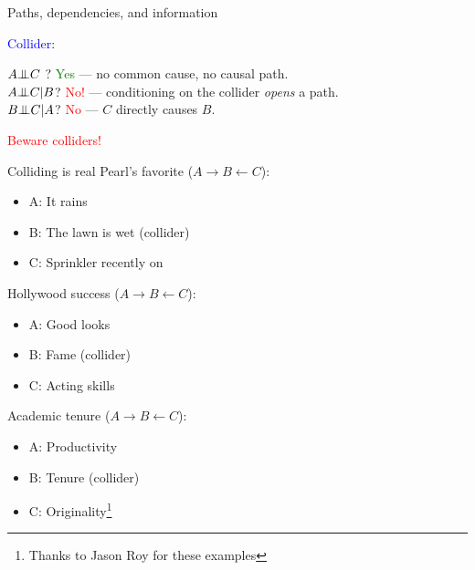 \documentclass[xcolor=dvipsnames]{beamer}
\newcommand{\ra}{\rightarrow}
\newcommand{\la}{\leftarrow}
\newcommand{\indep}{{\bot\negthickspace\negthickspace\bot}}
\begin{document}
\begin{frame}{Paths, dependencies, and information}

 \textcolor{blue}{Collider}: 
\begin{center}
\end{center}

\medskip
  $A \indep C$ ?  \textcolor{Green}{Yes} --- no common cause, no causal path.\\
 \medskip
{} $A \indep C | B$?  \textcolor{Red}{No!} --- conditioning on the collider \textit{opens} a path.\\
\medskip
{} $ B \indep C | A $?  \textcolor{Red}{No} --- $C$ directly causes $B$.
\begin{center}
 \textcolor{Red}{Beware colliders!}
\end{center}
\end{frame}

\begin{frame}{Colliding is real}
 \footnotesize
{} Pearl's favorite ($A \ra B \la C$): \\
\begin{itemize}
\item[] A: It rains
\item[] B: The lawn is wet (collider)
\item[] C: Sprinkler recently on
\end{itemize}
\bigskip
{} Hollywood success ($A \ra B \la C$):\\
\begin{itemize}
\item[] A: Good looks
\item[] B: Fame (collider)
\item[] C: Acting skills
\end{itemize}
\bigskip
{} Academic tenure ($A \ra B \la C$):\\
\begin{itemize}
\item[] A: Productivity
\item[] B: Tenure (collider)
\item[] C: Originality\footnote{Thanks to Jason Roy for these examples}
\end{itemize}
\end{frame}
\end{document}
